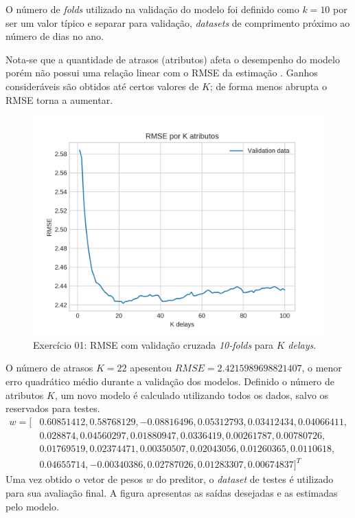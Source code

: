 \documentclass{article}
\begin{document}
    O número de \textit{folds} utilizado na validação do modelo foi definido como $k=10$ por ser um valor
    típico e separar para validação, \textit{datasets} de comprimento próximo ao número de dias no ano. 
    
    Nota-se que a quantidade de atrasos (atributos) afeta o desempenho do modelo
    porém não possui uma relação linear com o RMSE da estimação . Ganhos consideráveis
    são obtidos até certos valores de $K$; de forma menos abrupta o RMSE torna a aumentar.
    \begin{figure}[!ht]
        \centering
        \includegraphics[width=\linewidth]{ex01/folds.png}
        \caption{Exercício 01: RMSE com validação cruzada \textit{10-folds} para $K$ \textit{delays}.}
        \label{fig:ex1_kfold_rmse}
    \end{figure}
    O número de atrasos $K=22$ apesentou $RMSE=2.4215989698821407$, o menor erro quadrático médio durante a validação dos modelos.
    Definido o número de atributos $K$, um novo modelo é calculado utilizando todos os dados, salvo os reservados para testes.
    \begin{align*}
w=[ &0.60851412, 0.58768129, -0.08816496, 0.05312793, 0.03412434, 0.04066411, \\
    &0.028874  , 0.04560297,  0.01880947, 0.0336419,  0.00261787, 0.00780726, \\
    &0.01769519, 0.02374471,  0.00350507,  0.02043056,0.01260365, 0.0110618,  \\
    & 0.04655714, -0.00340386,  0.02787026,  0.01283307,  0.00674837]^T
    \end{align*}
    Uma vez obtido o vetor de pesos $w$ do preditor, o \textit{dataset} de testes é utilizado para
    sua avaliação final. A figura  apresentas as saídas desejadas e as estimadas pelo modelo.
\end{document}
